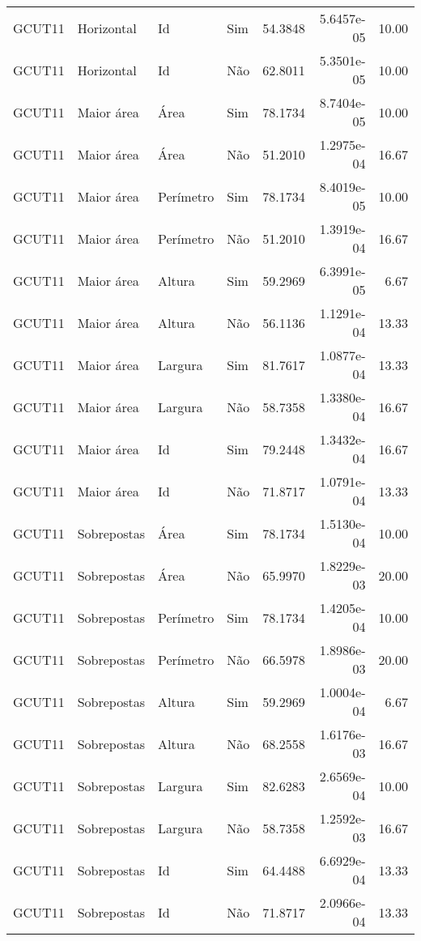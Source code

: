 \begin{tabular}{llllrrr}
    GCUT11    & Horizontal  & Id        & Sim         & 54.3848      & 5.6457e-05 & 10.00    \\
    GCUT11    & Horizontal  & Id        & Não         & 62.8011      & 5.3501e-05 & 10.00    \\
    GCUT11    & Maior área  & Área      & Sim         & 78.1734      & 8.7404e-05 & 10.00    \\
    GCUT11    & Maior área  & Área      & Não         & 51.2010      & 1.2975e-04 & 16.67    \\
    GCUT11    & Maior área  & Perímetro & Sim         & 78.1734      & 8.4019e-05 & 10.00    \\
    GCUT11    & Maior área  & Perímetro & Não         & 51.2010      & 1.3919e-04 & 16.67    \\
    GCUT11    & Maior área  & Altura    & Sim         & 59.2969      & 6.3991e-05 & 6.67     \\
    GCUT11    & Maior área  & Altura    & Não         & 56.1136      & 1.1291e-04 & 13.33    \\
    GCUT11    & Maior área  & Largura   & Sim         & 81.7617      & 1.0877e-04 & 13.33    \\
    GCUT11    & Maior área  & Largura   & Não         & 58.7358      & 1.3380e-04 & 16.67    \\
    GCUT11    & Maior área  & Id        & Sim         & 79.2448      & 1.3432e-04 & 16.67    \\
    GCUT11    & Maior área  & Id        & Não         & 71.8717      & 1.0791e-04 & 13.33    \\
    GCUT11    & Sobrepostas & Área      & Sim         & 78.1734      & 1.5130e-04 & 10.00    \\
    GCUT11    & Sobrepostas & Área      & Não         & 65.9970      & 1.8229e-03 & 20.00    \\
    GCUT11    & Sobrepostas & Perímetro & Sim         & 78.1734      & 1.4205e-04 & 10.00    \\
    GCUT11    & Sobrepostas & Perímetro & Não         & 66.5978      & 1.8986e-03 & 20.00    \\
    GCUT11    & Sobrepostas & Altura    & Sim         & 59.2969      & 1.0004e-04 & 6.67     \\
    GCUT11    & Sobrepostas & Altura    & Não         & 68.2558      & 1.6176e-03 & 16.67    \\
    GCUT11    & Sobrepostas & Largura   & Sim         & 82.6283      & 2.6569e-04 & 10.00    \\
    GCUT11    & Sobrepostas & Largura   & Não         & 58.7358      & 1.2592e-03 & 16.67    \\
    GCUT11    & Sobrepostas & Id        & Sim         & 64.4488      & 6.6929e-04 & 13.33    \\
    GCUT11    & Sobrepostas & Id        & Não         & 71.8717      & 2.0966e-04 & 13.33    \\
    \hline
\end{tabular}